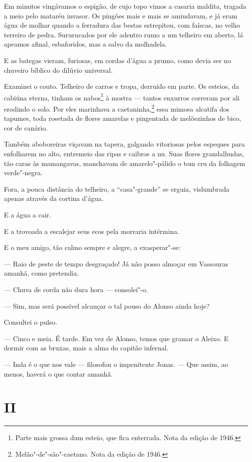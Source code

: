 Em minutos vingávamos o espigão, de cujo topo vimos a casaria maldita,
tragada a meio pelo mataréu invasor. Os pingões mais e mais se
amiudavam, e já eram água de molhar quando a ferradura das bestas
estrepitou, com faíscas, no velho terreiro de pedra. Sururucados por ele
adentro rumo a um telheiro em aberto, lá apeamos afinal, esbaforidos,
mas a salvo da molhadela.

E as bategas vieram, furiosas, em cordas d'água a prumo, como devia ser
no chuveiro bíblico do dilúvio universal.

Examinei o couto. Telheiro de carros e tropa, derruído em parte. Os
esteios, da cabiúna eterna, tinham os nabos\footnote{Parte mais grossa
  dum esteio, que fica enterrada. Nota da edição de 1946.} à mostra ---
tantos enxurros correram por ali erodindo o solo. Por eles marinhava a
caetaninha,\footnote{Melão"-de"-são"-caetano. Nota da edição de 1946.} essa
mimosa alcatifa dos tapumes, toda rosetada de flores amarelas e
pingentada de melõezinhos de bico, cor de canário.

Também aboboreiras viçavam na tapera, galgando vitoriosas pelos espeques
para enfolharem no alto, entremeio das ripas e caibros a nu. Suas flores
grandalhudas, tão caras às mamangavas, manchavam de amarelo"-pálido o tom
cru da folhagem verde"-negra.

Fora, a pouca distância do telheiro, a ``casa"-grande'' se erguia,
vislumbrada apenas através da cortina d'água.

E a água a cair.

E a trovoada a escalejar seus ecos pela morraria intérmina.

E o meu amigo, tão calmo sempre e alegre, a exasperar"-se:

--- Raio de peste de tempo desgraçado! Já não posso almoçar em Vassouras
amanhã, como pretendia.

--- Chuva de corda não dura hora --- consolei"-o.

--- Sim, mas será possível alcançar o tal pouso do Alonso ainda hoje?

Consultei o pulso.

--- Cinco e meia. É tarde. Em vez de Alonso, temos que gramar o Aleixo.
E dormir com as bruxas, mais a alma do capitão infernal.

--- Inda é o que nos vale --- filosofou o impenitente Jonas. --- Que
assim, ao menos, haverá o que contar amanhã.

\section*{II}

